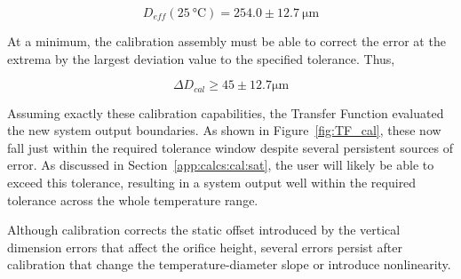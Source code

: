 \documentclass[12pt, letterpaper]{report}%
\newcommand{\Dref}{D_{eff}(\SI{25}{\celsius}) = 254.0 \pm \SI{12.7}{\micro\meter}}
\begin{document}
\begin{appendices}
			\begin{equation}
				\Dref
			\end{equation}

			At a minimum, the calibration assembly must be able to correct the error at the extrema by the largest deviation value to the specified tolerance. Thus,

			\begin{equation}
				\Delta D_{cal} \geq 45 \pm 12.7\si{\micro\meter}
			\end{equation}

			Assuming exactly these calibration capabilities, the Transfer Function evaluated the new system output boundaries.
			As shown in Figure~\ref{fig:TF_cal}, these now fall just within the required tolerance window despite several persistent sources of error.
			As discussed in Section~\ref{app:calcs:cal:sat}, the user will likely be able to exceed this tolerance, resulting in a system output well within the required tolerance across the whole temperature range.

			Although calibration corrects the static offset introduced by the vertical dimension errors that affect the orifice height, several errors persist after calibration that change the temperature-diameter slope or introduce nonlinearity.


\end{appendices}
\end{document}
